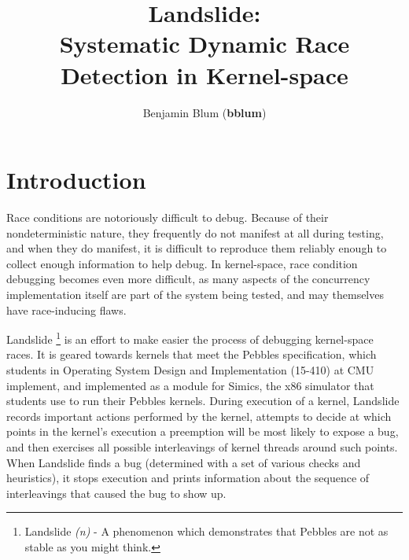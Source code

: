 \documentclass[twocolumn]{article}
\begin{document}
\captionsetup{width=.75\textwidth,font=small,labelfont=bf}
\title{\bf Landslide: \\ Systematic Dynamic Race Detection in Kernel-space}
\author{Benjamin Blum (\textbf{bblum})}
\maketitle

\newcommand\true{\;\textit{true}}
\newcommand\false{\;\textit{false}}

\newcommand\alpher\alpha
\newcommand\beter\beta
\newcommand\gammer\gamma
\newcommand\delter\delta
\newcommand\zeter\zeta
\newcommand\Sigmer\Sigma

\newcommand\NN{\mathbb{N}}
\newcommand\QQ{\mathbb{Q}}
\newcommand\RR{\mathbb{R}}
\newcommand\ZZ{\mathbb{Z}}

\begin{abstract}

\end{abstract}

\section{Introduction}


Race conditions are notoriously difficult to debug.
Because of their nondeterministic nature, they frequently do not manifest at all during testing, and when they do manifest, it is difficult to reproduce them reliably enough to collect enough information to help debug.
In kernel-space, race condition debugging becomes even more difficult, as many aspects of the concurrency implementation itself are part of the system being tested, and may themselves have race-inducing flaws.


Landslide
\footnote{Landslide {\em (n)} - A phenomenon which demonstrates that Pebbles are not as stable as you might think.}
is an effort to make easier the process of debugging kernel-space races.
It is geared towards kernels that meet the Pebbles specification, which students in Operating System Design and Implementation (15-410) at CMU implement, and implemented as a module for Simics, the x86 simulator that students use to run their Pebbles kernels.
During execution of a kernel, Landslide records important actions performed by the kernel, attempts to decide at which points in the kernel's execution a preemption will be most likely to expose a bug, and then exercises all possible interleavings of kernel threads around such points.
When Landslide finds a bug (determined with a set of various checks and heuristics), it stops execution and prints information about the sequence of interleavings that caused the bug to show up.
\end{document}
